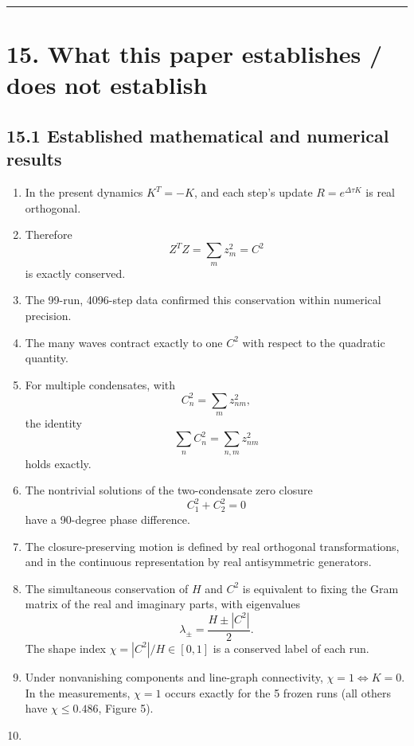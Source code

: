 \documentclass[
  a4paper,
]{article}
\providecommand{\tightlist}{%
  \setlength{\itemsep}{0pt}\setlength{\parskip}{0pt}}
\begin{document}
\begin{center}\rule{0.5\linewidth}{0.5pt}\end{center}

\section{15. What this paper establishes / does not
establish}\label{what-this-paper-establishes-does-not-establish}

\subsection{15.1 Established mathematical and numerical
results}\label{established-mathematical-and-numerical-results}

\begin{enumerate}
\def\labelenumi{\arabic{enumi}.}
\tightlist
\item
  In the present dynamics \(K^T=-K\), and each step's update
  \(R=e^{\Delta\tau K}\) is real orthogonal.
\item
  Therefore \[
  Z^TZ=\sum_mz_m^2=C^2
  \] is exactly conserved.
\item
  The 99-run, 4096-step data confirmed this conservation within
  numerical precision.
\item
  The many waves contract exactly to one \(C^2\) with respect to the
  quadratic quantity.
\item
  For multiple condensates, with \[
  C_n^2=\sum_mz_{nm}^2,
  \] the identity \[
  \sum_nC_n^2=\sum_{n,m}z_{nm}^2
  \] holds exactly.
\item
  The nontrivial solutions of the two-condensate zero closure \[
  C_1^2+C_2^2=0
  \] have a 90-degree phase difference.
\item
  The closure-preserving motion is defined by real orthogonal
  transformations, and in the continuous representation by real
  antisymmetric generators.
\item
  The simultaneous conservation of \(H\) and \(C^2\) is equivalent to
  fixing the Gram matrix of the real and imaginary parts, with
  eigenvalues \[
  \lambda_\pm=\frac{H\pm|C^2|}{2}.
  \] The shape index \(\chi=|C^2|/H\in[0,1]\) is a conserved label of
  each run.
\item
  Under nonvanishing components and line-graph connectivity,
  \(\chi=1\iff K=0\). In the measurements, \(\chi=1\) occurs exactly for
  the 5 frozen runs (all others have \(\chi\le0.486\), Figure 5).
\item

\end{enumerate}
\end{document}
